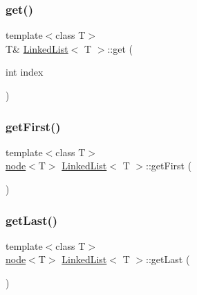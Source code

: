 \mbox{\label{class_linked_list_aa34d85df4f82f094ba9d6f4708519ebd}} 
\subsubsection{\texorpdfstring{get()}{get()}}
{\footnotesize\ttfamily template$<$class T$>$ \\
T\& \mbox{\hyperlink{class_linked_list}{Linked\+List}}$<$ T $>$\+::get (\begin{DoxyParamCaption}\item[{int}]{index }\end{DoxyParamCaption})\hspace{0.3cm}{\ttfamily [inline]}}

\mbox{\label{class_linked_list_a793ceff04b597446486983d4d651e943}} 
\subsubsection{\texorpdfstring{get\+First()}{getFirst()}}
{\footnotesize\ttfamily template$<$class T$>$ \\
\mbox{\hyperlink{structnode}{node}}$<$T$>$ \mbox{\hyperlink{class_linked_list}{Linked\+List}}$<$ T $>$\+::get\+First (\begin{DoxyParamCaption}{ }\end{DoxyParamCaption})\hspace{0.3cm}{\ttfamily [inline]}}

\mbox{\label{class_linked_list_ad5443b28b382db29e5a5a552b9a3dddc}} 
\subsubsection{\texorpdfstring{get\+Last()}{getLast()}}
{\footnotesize\ttfamily template$<$class T$>$ \\
\mbox{\hyperlink{structnode}{node}}$<$T$>$ \mbox{\hyperlink{class_linked_list}{Linked\+List}}$<$ T $>$\+::get\+Last (\begin{DoxyParamCaption}{ }\end{DoxyParamCaption})\hspace{0.3cm}{\ttfamily [inline]}}

